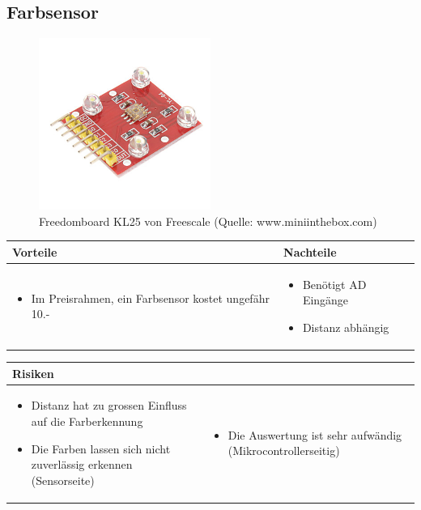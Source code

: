 

\subsection{Farbsensor}
\begin{figure}[h]
	\centering
	\includegraphics[width=0.5\textwidth]{fig/Farbsensor}
	\caption{Freedomboard KL25 von Freescale (Quelle: www.miniinthebox.com)}
\end{figure}


\begin{table}[h]
\begin{tabular}{p{} | p{}}


 \textbf{Vorteile} & \textbf{Nachteile} \\ \hline
	 
\begin{itemize}
\item Im Preisrahmen, ein Farbsensor kostet ungefähr 10.-
\end{itemize}

 &
 
\begin{itemize}
\item Benötigt  AD Eingänge
\item Distanz abhängig
\end{itemize}

\end{tabular}
\end{table}

\begin{table}[h]
\begin{tabular}{p{}p{}}


 \textbf{Risiken} & \\ \hline
	 
\begin{itemize}
\item Distanz hat zu grossen Einfluss auf die Farberkennung
\item Die Farben lassen sich nicht zuverlässig erkennen (Sensorseite)
\end{itemize}
&
\begin{itemize}
\item Die Auswertung ist sehr aufwändig (Mikrocontrollerseitig)
\end{itemize}

 
\end{tabular}
\end{table}

